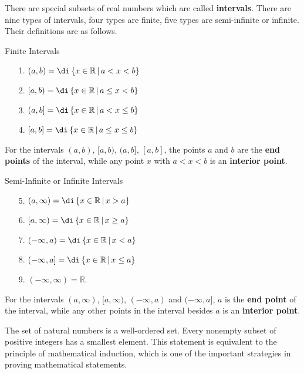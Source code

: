 There are special subsets of real numbers which are called {\bf intervals}.  There are nine types of intervals, four types are finite, five types are semi-infinite or infinite.  Their definitions are as follows. 

\begin{highlight}{Finite Intervals}

\begin{enumerate}
\item[1.] $(a,b)=\di\left\{x\in\mathbb{R}\,|\, a<x<b\right\}$
\item[2.] $[a,b)=\di\left\{x\in\mathbb{R}\,|\, a\leq x<b\right\}$
\item[3.] $(a,b]=\di\left\{x\in\mathbb{R}\,|\, a<x\leq b\right\}$
\item[4.] $[a,b]=\di\left\{x\in\mathbb{R}\,|\, a\leq x \leq b\right\}$
\end{enumerate}
\end{highlight}

For the intervals $(a, b)$, $[a, b)$, $(a, b]$, $[a, b]$, the points $a$ and $b$ are the {\bf end points} of the interval, while any point $x$ with $a<x<b$ is an {\bf interior point}.

\begin{highlight}{Semi-Infinite or Infinite Intervals}
\begin{enumerate}
\item[5.] $(a,\infty)=\di\left\{x\in\mathbb{R}\,|\, x>a\right\}$
\item[6.] $[a,\infty)=\di\left\{x\in\mathbb{R}\,|\, x\geq a\right\}$
\item[7.] $(-\infty, a)=\di\left\{x\in\mathbb{R}\,|\, x<a\right\}$
\item[8.] $(-\infty, a]=\di\left\{x\in\mathbb{R}\,|\, x\leq a\right\}$
\item[9.] $(-\infty, \infty)=\mathbb{R}$.
\end{enumerate}
\end{highlight}

  For  the intervals $(a, \infty)$, $[a, \infty)$, $(-\infty, a)$ and $(-\infty, a]$, $a$ is the {\bf end point} of the interval, while any other points in the interval besides $a$ is an {\bf interior point}.

The set of natural numbers is a well-ordered set. Every nonempty subset of positive integers has a smallest element.  This statement is equivalent to the principle of mathematical induction, which is one of the  important strategies in proving mathematical statements.


